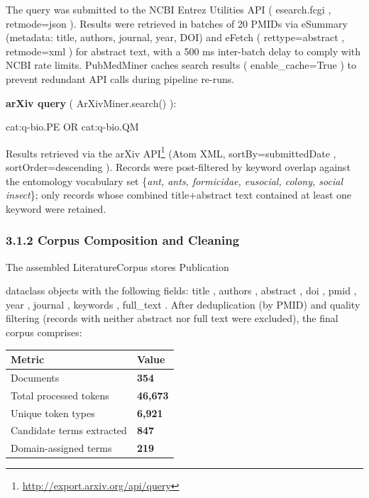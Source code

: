 \documentclass[
]{article}
\newenvironment{Shaded}{}{}
\newcommand{\NormalTok}[1]{#1}
\newcounter{none} %
\numberwithin{equation}{section}
\renewcommand{\texttt}[1]{%
    \colorbox{codebg}{\color{codefg}\ttfamily #1}%
}
\DeclareRobustCommand{\href}[2]{#2\footnote{\url{#1}}}
\begin{document}
The query was submitted to the NCBI Entrez Utilities API
(\texttt{esearch.fcgi}, \texttt{retmode=json}). Results were retrieved
in batches of 20 PMIDs via \texttt{eSummary} (metadata: title, authors,
journal, year, DOI) and \texttt{eFetch} (\texttt{rettype=abstract},
\texttt{retmode=xml}) for abstract text, with a 500 ms inter-batch delay
to comply with NCBI rate limits. \texttt{PubMedMiner} caches search
results (\texttt{enable\_cache=True}) to prevent redundant API calls
during pipeline re-runs.

\textbf{arXiv query} (\texttt{ArXivMiner.search()}):

\begin{Shaded}
\begin{Highlighting}[]
\NormalTok{cat:q{-}bio.PE OR cat:q{-}bio.QM}
\end{Highlighting}
\end{Shaded}

Results retrieved via the \href{http://export.arxiv.org/api/query}{arXiv
API} (Atom XML, \texttt{sortBy=submittedDate},
\texttt{sortOrder=descending}). Records were post-filtered by keyword
overlap against the entomology vocabulary set \{\emph{ant, ants,
formicidae, eusocial, colony, social insect}\}; only records whose
combined title+abstract text contained at least one keyword were
retained.

\subsubsection{3.1.2 Corpus Composition and
Cleaning}\label{corpus-composition-and-cleaning}

The assembled \texttt{LiteratureCorpus} stores \texttt{Publication}
dataclass objects with the following fields: \texttt{title},
\texttt{authors}, \texttt{abstract}, \texttt{doi}, \texttt{pmid},
\texttt{year}, \texttt{journal}, \texttt{keywords}, \texttt{full\_text}.
After deduplication (by PMID) and quality filtering (records with
neither abstract nor full text were excluded), the final corpus
comprises:

{\def\LTcaptype{none} %
\begin{longtable}[]{@{}ll@{}}
\toprule\noalign{}
Metric & Value \\
\midrule\noalign{}
\endhead
\bottomrule\noalign{}
\endlastfoot
Documents & \textbf{354} \\
Total processed tokens & \textbf{46,673} \\
Unique token types & \textbf{6,921} \\
Candidate terms extracted & \textbf{847} \\
Domain-assigned terms & \textbf{219} \\
\end{longtable}
}
\end{document}
